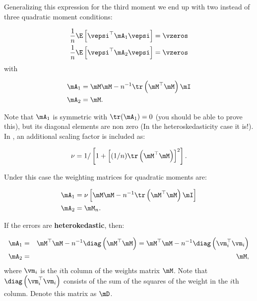 \documentclass[english,12pt]{book}\usepackage[]{graphicx}\usepackage[]{xcolor}
\begin{document}
Generalizing this expression for the third moment we end up with two instead of three quadratic moment conditions:

\begin{equation}\label{eq:moment_conditions_reduced}
	\begin{aligned}
\frac{1}{n}\E\left[\vepsi^\top\mA_1\vepsi\right] & =  \vzeros \\
\frac{1}{n}\E\left[\vepsi^\top\mA_2\vepsi\right] & =  \vzeros
	\end{aligned}
\end{equation}
%
with

\begin{equation*}
  \begin{aligned}
\mA_1 &= \mM\mM - n^{-1}\tr\left(\mM^\top\mM\right)\mI \\
\mA_2 &= \mM.
\end{aligned}
\end{equation*}

Note that $\mA_1$ is symmetric with $\tr(\mA_1) = 0$ (you should be able to prove this), but its diagonal elements are non zero (In the heteroskedasticity case it is!). In \cite{drukker2013two}, an additional scaling factor is included as:

\begin{equation*}
  \nu = 1 / \left[1 + \left[(1 / n) \tr\left(\mM^\top\mM\right)\right]^2\right].
\end{equation*}

Under this case the weighting matrices for quadratic moments are:

\begin{equation*}
\begin{aligned}
  \mA_{1} & = \nu \left[ \mM\mM - n^{-1}\tr\left(\mM^\top\mM\right)\mI\right] \\
  \mA_{2} & = \mM_n. 
\end{aligned}
\end{equation*}

If the errors are \textbf{heterokedastic}, then:

\begin{eqnarray*}
\mA_1 &=& \mM^\top\mM - n^{-1}\diag\left(\mM^\top\mM\right) = \mM^\top\mM - n^{-1}\diag\left(\vm^\top_i\vm_i\right) \\
\mA_2 &=& \mM,
\end{eqnarray*}
%
where $\vm_i$ is the $i$th column of the weights matrix $\mM$. Note that $\diag\left(\vm^\top_i\vm_i\right)$ consists of the sum of the squares of the weight in the $i$th column. Denote this matrix as $\mD$.
\end{document}
